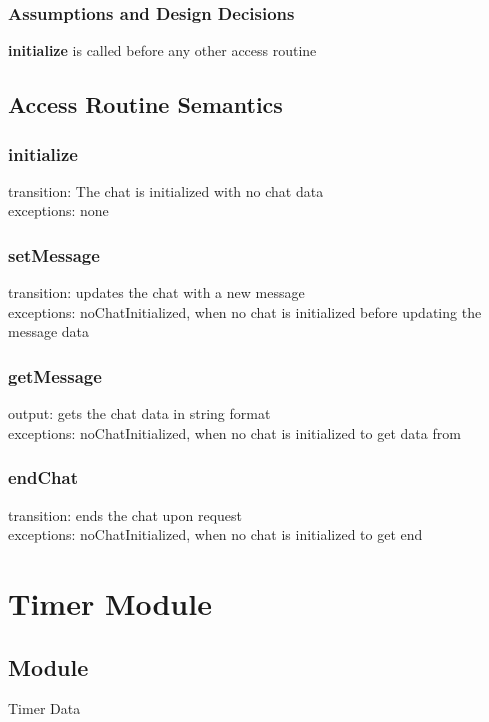 \documentclass{article}
\begin{document}
        \subsubsection*{Assumptions and Design Decisions}
            \textbf{initialize} is called before any other access routine
            
    \subsection*{Access Routine Semantics}
    \subsubsection*{initialize} 
            transition: The chat is initialized with no chat data\\
            exceptions: none
            
        \subsubsection*{setMessage} 
            transition: updates the chat with a new message\\
            exceptions: noChatInitialized, when no chat is initialized before updating the message data\\
        
        \subsubsection*{getMessage} 
            output: gets the chat data in string format\\
            exceptions: noChatInitialized, when no chat is initialized to get data from\\
        
        \subsubsection*{endChat} 
            transition: ends the chat upon request\\
            exceptions: noChatInitialized, when no chat is initialized to get end\\

\newpage
\section*{Timer Module}
    \subsection*{Module}
        Timer Data
    
\end{document}
